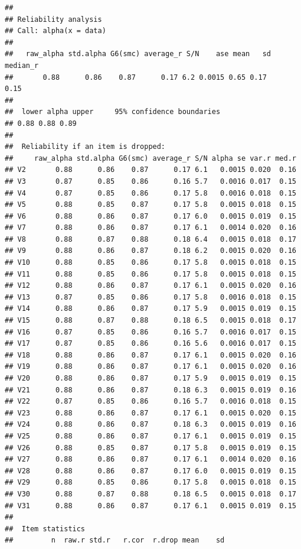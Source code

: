 \documentclass[
  english,
  man]{apa6}
\begin{document}
\begin{verbatim}
## 
## Reliability analysis   
## Call: alpha(x = data)
## 
##   raw_alpha std.alpha G6(smc) average_r S/N    ase mean   sd median_r
##       0.88      0.86    0.87      0.17 6.2 0.0015 0.65 0.17     0.15
## 
##  lower alpha upper     95% confidence boundaries
## 0.88 0.88 0.89 
## 
##  Reliability if an item is dropped:
##     raw_alpha std.alpha G6(smc) average_r S/N alpha se var.r med.r
## V2       0.88      0.86    0.87      0.17 6.1   0.0015 0.020  0.16
## V3       0.87      0.85    0.86      0.16 5.7   0.0016 0.017  0.15
## V4       0.87      0.85    0.86      0.17 5.8   0.0016 0.018  0.15
## V5       0.88      0.85    0.87      0.17 5.8   0.0015 0.018  0.15
## V6       0.88      0.86    0.87      0.17 6.0   0.0015 0.019  0.15
## V7       0.88      0.86    0.87      0.17 6.1   0.0014 0.020  0.16
## V8       0.88      0.87    0.88      0.18 6.4   0.0015 0.018  0.17
## V9       0.88      0.86    0.87      0.18 6.2   0.0015 0.020  0.16
## V10      0.88      0.85    0.86      0.17 5.8   0.0015 0.018  0.15
## V11      0.88      0.85    0.86      0.17 5.8   0.0015 0.018  0.15
## V12      0.88      0.86    0.87      0.17 6.1   0.0015 0.020  0.16
## V13      0.87      0.85    0.86      0.17 5.8   0.0016 0.018  0.15
## V14      0.88      0.86    0.87      0.17 5.9   0.0015 0.019  0.15
## V15      0.88      0.87    0.88      0.18 6.5   0.0015 0.018  0.17
## V16      0.87      0.85    0.86      0.16 5.7   0.0016 0.017  0.15
## V17      0.87      0.85    0.86      0.16 5.6   0.0016 0.017  0.15
## V18      0.88      0.86    0.87      0.17 6.1   0.0015 0.020  0.16
## V19      0.88      0.86    0.87      0.17 6.1   0.0015 0.020  0.16
## V20      0.88      0.86    0.87      0.17 5.9   0.0015 0.019  0.15
## V21      0.88      0.86    0.87      0.18 6.3   0.0015 0.019  0.16
## V22      0.87      0.85    0.86      0.16 5.7   0.0016 0.018  0.15
## V23      0.88      0.86    0.87      0.17 6.1   0.0015 0.020  0.15
## V24      0.88      0.86    0.87      0.18 6.3   0.0015 0.019  0.16
## V25      0.88      0.86    0.87      0.17 6.1   0.0015 0.019  0.15
## V26      0.88      0.85    0.87      0.17 5.8   0.0015 0.019  0.15
## V27      0.88      0.86    0.87      0.17 6.1   0.0014 0.020  0.16
## V28      0.88      0.86    0.87      0.17 6.0   0.0015 0.019  0.15
## V29      0.88      0.85    0.86      0.17 5.8   0.0015 0.018  0.15
## V30      0.88      0.87    0.88      0.18 6.5   0.0015 0.018  0.17
## V31      0.88      0.86    0.87      0.17 6.1   0.0015 0.019  0.15
## 
##  Item statistics 
##         n  raw.r std.r   r.cor  r.drop mean    sd

\end{verbatim}
\end{document}
